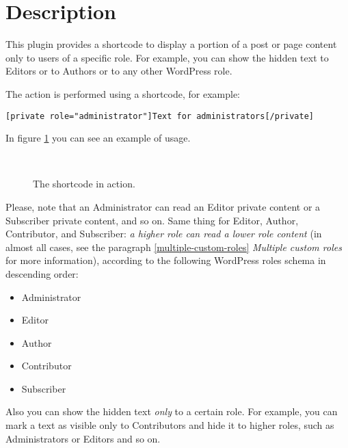 \section{Description}

This plugin provides a shortcode to display a portion of a post or page content
only to users of a specific role. For example, you can show the hidden text to
Editors or to Authors or to any other WordPress role.

The action is performed using a shortcode, for example:

\begin{lstlisting}
[private role="administrator"]Text for administrators[/private]
\end{lstlisting}

In figure \ref{fig:shortcode-action} you can see an example of usage.

\begin{figure}[h]
	\centering
	 \\
	\caption{The shortcode in action.}
	\label{fig:shortcode-action}
\end{figure}

Please, note that an Administrator can read an Editor private content or a
Subscriber private content, and so on. Same thing for Editor, Author,
Contributor, and Subscriber: \textit{a higher role can read a lower role
content} (in almost all cases, see the paragraph \ref{multiple-custom-roles}
\textit{Multiple custom roles} for more information), according to the following
WordPress roles schema in descending order:

\begin{itemize}
	\item Administrator
	\item Editor
	\item Author
	\item Contributor
	\item Subscriber
\end{itemize}

Also you can show the hidden text \textit{only} to a certain role. For example,
you can mark a text as visible only to Contributors and hide it to higher roles,
such as Administrators or Editors and so on.

